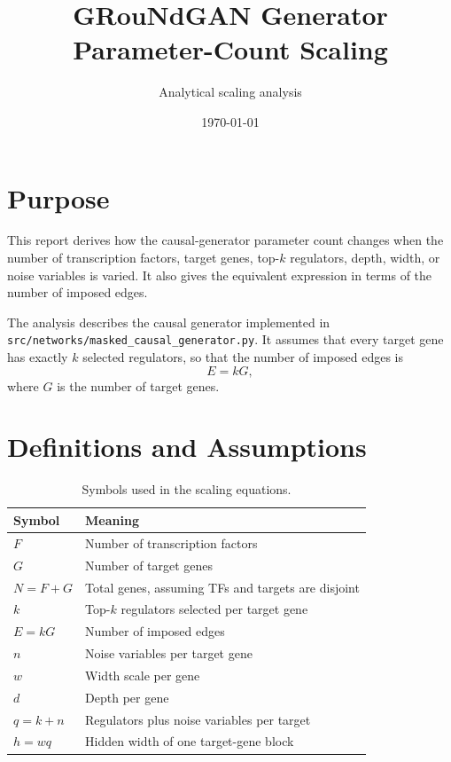\documentclass[11pt]{article}
\title{GRouNdGAN Generator Parameter-Count Scaling}
\author{Analytical scaling analysis}
\date{\today}
\begin{document}
\maketitle

\section{Purpose}

This report derives how the causal-generator parameter count changes when the number of
transcription factors, target genes, top-$k$ regulators, depth, width, or noise variables is
varied. It also gives the equivalent expression in terms of the number of imposed edges.

The analysis describes the causal generator implemented in
\texttt{src/networks/masked\_causal\_generator.py}. It assumes that every target gene has exactly
$k$ selected regulators, so that the number of imposed edges is
\begin{equation}
E = kG,
\end{equation}
where $G$ is the number of target genes.

\section{Definitions and Assumptions}

\begin{table}[H]
\centering
\caption{Symbols used in the scaling equations.}
\begin{tabular}{ll}
\toprule
Symbol & Meaning \\
\midrule
$F$ & Number of transcription factors \\
$G$ & Number of target genes \\
$N=F+G$ & Total genes, assuming TFs and targets are disjoint \\
$k$ & Top-$k$ regulators selected per target gene \\
$E=kG$ & Number of imposed edges \\
$n$ & Noise variables per target gene \\
$w$ & Width scale per gene \\
$d$ & Depth per gene \\
$q=k+n$ & Regulators plus noise variables per target \\
$h=wq$ & Hidden width of one target-gene block \\
\bottomrule
\end{tabular}
\end{table}
\end{document}
